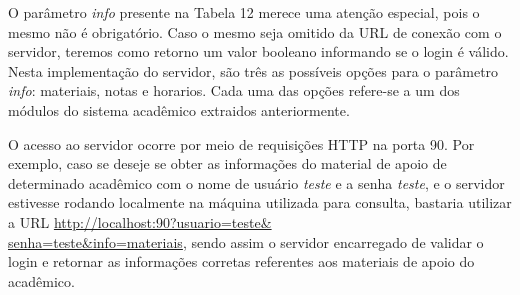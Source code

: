 O parâmetro \emph{info} presente na Tabela 12 merece uma atenção especial, pois o mesmo não é obrigatório. Caso o mesmo seja omitido da URL de conexão com o servidor, teremos como retorno um valor booleano informando se o login é válido. Nesta implementação do servidor, são três as possíveis opções para o parâmetro \emph{info}: materiais, notas e horarios. Cada uma das opções refere-se a um dos módulos do sistema acadêmico extraidos anteriormente.

O acesso ao servidor ocorre por meio de requisições HTTP na porta 90. Por exemplo, caso se deseje se obter as informações do material de apoio de determinado acadêmico com o nome de usuário \emph{teste} e a senha \emph{teste}, e o servidor estivesse rodando localmente na máquina utilizada para consulta, bastaria utilizar a URL \url{http://localhost:90?usuario=teste&}\\ \url{senha=teste&info=materiais}, sendo assim o servidor encarregado de validar o login e retornar as informações corretas referentes aos materiais de apoio do acadêmico.